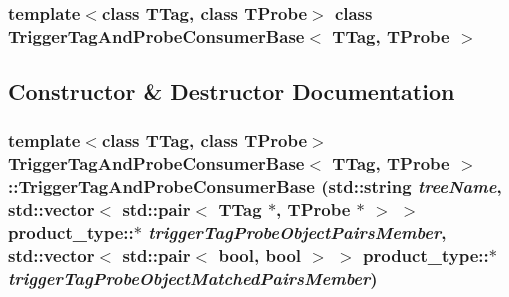 \subsubsection*{template$<$class TTag, class TProbe$>$ class TriggerTagAndProbeConsumerBase$<$ TTag, TProbe $>$}



\subsection{Constructor \& Destructor Documentation}
\hypertarget{classTriggerTagAndProbeConsumerBase_aa1e0b20a2b8a635398ce30b094028164}{
\subsubsection[{TriggerTagAndProbeConsumerBase}]{\setlength{\rightskip}{0pt plus 5cm}template$<$class TTag, class TProbe$>$ {\bf TriggerTagAndProbeConsumerBase}$<$ TTag, TProbe $>$::{\bf TriggerTagAndProbeConsumerBase} (std::string {\em treeName}, \/  std::vector$<$ std::pair$<$ TTag $\ast$, TProbe $\ast$ $>$ $>$ product\_\-type::$\ast$ {\em triggerTagProbeObjectPairsMember}, \/  std::vector$<$ std::pair$<$ bool, bool $>$ $>$ product\_\-type::$\ast$ {\em triggerTagProbeObjectMatchedPairsMember})}}
\label{classTriggerTagAndProbeConsumerBase_aa1e0b20a2b8a635398ce30b094028164}


